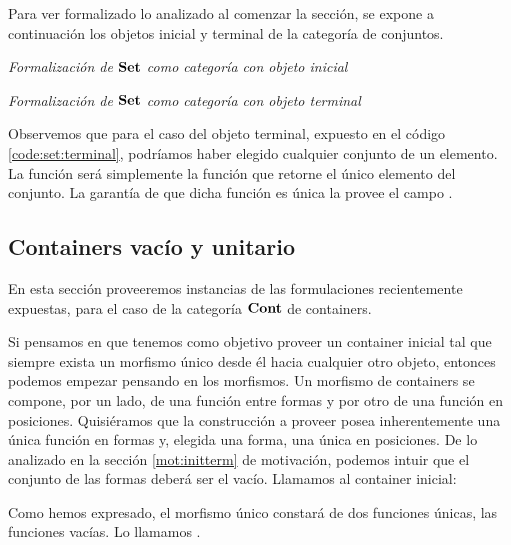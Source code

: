 Para ver formalizado lo analizado al comenzar la sección, se expone a continuación los objetos inicial y terminal de la categoría de conjuntos.


\begin{agdacode}{\it Formalización de $\mathbf{Set}$ como categoría con objeto inicial}\hspace{3ex}\label{code:set:initial}
  
\end{agdacode}

\begin{agdacode}{\it Formalización de $\mathbf{Set}$ como categoría con objeto terminal}\hspace{3ex}\label{code:set:terminal}
  
\end{agdacode}

Observemos que para el caso del objeto terminal, expuesto en el código \ref{code:set:terminal}, podríamos haber elegido cualquier conjunto de un elemento. La función  será simplemente la función que retorne el único elemento del conjunto. La garantía de que dicha función es única la provee el campo .


\subsection{Containers vacío y unitario}



En esta sección proveeremos instancias de las formulaciones recientemente expuestas, para el caso de la categoría $\mathbf{Cont}$ de containers.

Si pensamos en que tenemos como objetivo proveer un container inicial tal que siempre exista un morfismo único desde él hacia cualquier otro objeto, entonces podemos empezar pensando en los morfismos. Un morfismo de containers se compone, por un lado, de una función entre formas y por otro de una función en posiciones. Quisiéramos que la construcción a proveer posea inherentemente una única función en formas y, elegida una forma, una única en posiciones. De lo analizado en la sección \ref{mot:initterm} de motivación, podemos intuir que el conjunto de las formas deberá ser el vacío. Llamamos  al container inicial:


Como hemos expresado, el morfismo único constará de dos funciones únicas, las funciones vacías. Lo llamamos .

